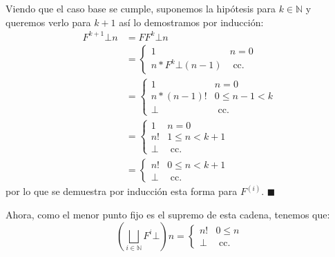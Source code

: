 \documentclass{article}
\newcommand{\N}{\mathbb{N}}
\newcommand{\supr}{\bigsqcup\limits}
\begin{document}
Viendo que el caso base se cumple, suponemos la hipótesis para $k \in \N$ y queremos verlo para $k+1$ así lo demostramos por inducción:
\begin{equation*}
	\begin{aligned}
		F^{k+1} \bot n & = F F^k \bot n                      \\
		               & = \begin{cases}
			                   1                  & n = 0        \\
			                   n * F^k \bot (n-1) & \text{ cc. }
		                   \end{cases} \\
		               & = \begin{cases}
			                   1          & n = 0          \\
			                   n * (n-1)! & 0 \leq n-1 < k \\
			                   \bot       & \text{ cc. }
		                   \end{cases}       \\
		               & = \begin{cases}
			                   1    & n = 0          \\
			                   n!   & 1 \leq n < k+1 \\
			                   \bot & \text{ cc. }
		                   \end{cases}             \\
		               & = \begin{cases}
			                   n!   & 0 \leq n < k+1 \\
			                   \bot & \text{ cc. }
		                   \end{cases}
	\end{aligned}
\end{equation*}
por lo que se demuestra por inducción esta forma para $F^{(i)}$. $\blacksquare$

Ahora, como el menor punto fijo es el supremo de esta cadena, tenemos que:
\begin{equation*}
	\left(\supr_{i \in \N} F^i \bot \right) n = \begin{cases}
		n!   & 0 \leq n     \\
		\bot & \text{ cc. }
	\end{cases}
\end{equation*}
\end{document}

